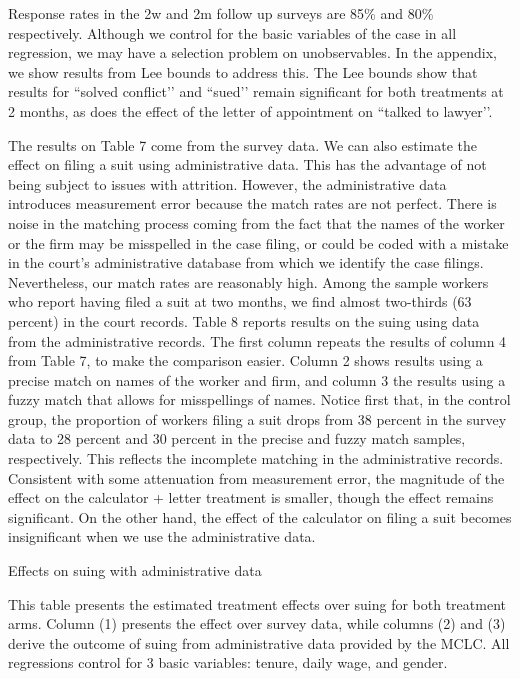 \documentclass[oneside,12pt]{article}
\begin{document}
Response rates in the 2w and 2m follow up surveys are 85\% and 80\% respectively. Although we control for the basic variables of the case in all regression, we may have a selection problem on unobservables. In the appendix, we show results from Lee bounds to address this. The Lee bounds show that results for “solved conflict’’ and “sued’’ remain significant for both treatments at 2 months, as does the effect of the letter of appointment on “talked to lawyer’’.

The results on Table 7 come from the survey data. We can also estimate the effect on filing a suit using administrative data. This has the advantage of not being subject to issues with attrition. However, the administrative data introduces measurement error because the match rates are not perfect. There is noise in the matching process coming from the fact that the names of the worker or the firm may be misspelled in the case filing, or could be coded with a mistake in the court’s administrative database from which we identify the case filings. Nevertheless, our match rates are reasonably high. Among the sample workers who report having filed a suit at two months, we find almost two-thirds (63 percent) in the court records. Table 8 reports results on the suing using data from the administrative records. The first column repeats the results of column 4 from Table 7, to make the comparison easier. Column 2 shows results using a precise match on names of the worker and firm, and column 3 the results using a fuzzy match that allows for misspellings of names. Notice first that, in the control group, the proportion of workers filing a suit drops from 38 percent in the survey data to 28 percent and 30 percent in the precise and fuzzy match samples, respectively. This reflects the incomplete matching in the administrative records. Consistent with some attenuation from measurement error, the magnitude of the effect on the calculator + letter treatment is smaller, though the effect remains significant. On the other hand, the effect of the calculator on filing a suit becomes insignificant when we use the administrative data. 

\begin{table}[!ht]
    \caption{Effects on suing with administrative data} 
    \label{tab:8}
    \center
    \notesize{}
    \begin{figurenotes}
    This table presents the estimated treatment effects over suing for both treatment arms. Column (1) presents the effect over survey data, while columns (2) and (3) derive the outcome of suing from administrative data provided by the MCLC. All regressions control for 3 basic variables: tenure, daily wage, and gender. 
    \end{figurenotes}
  
\end{table}
\end{document}
